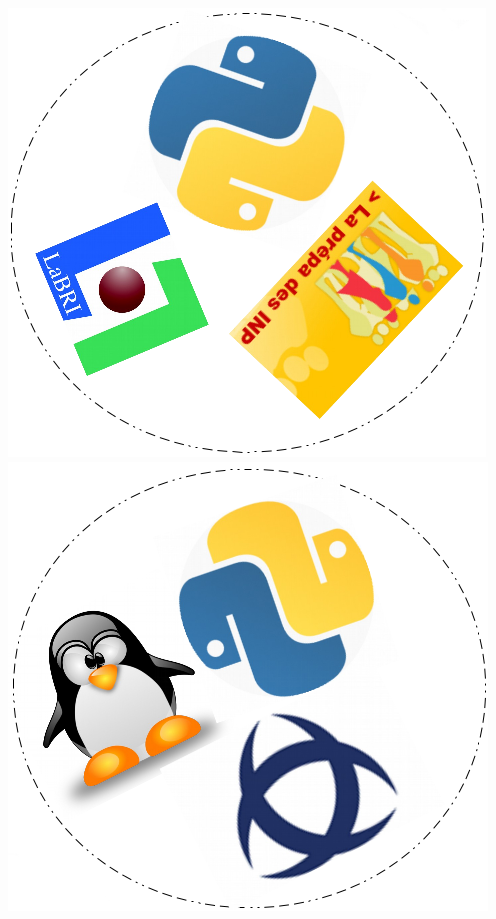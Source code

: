 \documentclass[a4paper]{article}
\begin{document}
\includegraphics[scale=0.43]{dobble3.png}
\includegraphics[scale=0.43]{dobble4.png}\\
\end{document}
